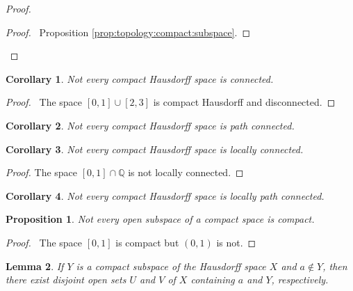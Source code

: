 \documentclass{report}
\let\qed\relax
\newtheorem{lm}{Lemma}[section]
\newtheorem{prop}[lm]{Proposition}
\newtheorem{cor}{Corollary}[lm]
\theoremstyle{definition}
\begin{document}
  \begin{proof}
    \pf
    \qedstep
    \begin{proof}
      \pf\ Proposition \ref{prop:topology:compact:subspace}.
    \end{proof}
    \qed
  \end{proof}

\begin{cor}
  Not every compact Hausdorff space is connected.
\end{cor}

\begin{proof}
  \pf\ The space $[0,1] \cup [2,3]$ is compact Hausdorff and disconnected. \qed
\end{proof}

\begin{cor}
  Not every compact Hausdorff space is path connected.
\end{cor}

\begin{cor}
  Not every compact Hausdorff space is locally connected.
\end{cor}

\begin{proof}
  The space $[0,1] \cap \mathbb{Q}$ is not locally connected.
\end{proof}

\begin{cor}
  Not every compact Hausdorff space is locally path connected.
\end{cor}

\begin{prop}
  Not every open subspace of a compact space is compact.
\end{prop}

\begin{proof}
  \pf\ The space $[0,1]$ is compact but $(0,1)$ is not. \qed
\end{proof}

  \begin{lm}
    \label{lm:topology:compact:regular}
    If $Y$ is a compact subspace of the Hausdorff space $X$ and $a \notin Y$,
    then there exist disjoint open sets $U$ and $V$ of $X$ containing $a$ and
    $Y$,
    respectively.
  \end{lm}
\end{document}
